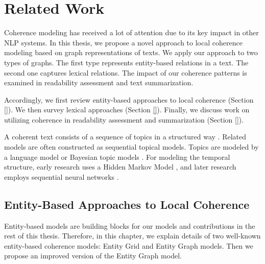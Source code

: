 
\chapter{Related Work}
\label{ch:related_work}
 
Coherence modeling has received a lot of attention due to its key impact in other NLP systems. 
In this thesis, we propose a novel approach to local coherence modeling based on graph representations of texts. 
We apply our approach to two types of graphs. 
The first type represents entity-based relations in a text.
The second one captures lexical relations. 
The impact of our coherence patterns is examined in readability assessment and text summarization. 

Accordingly, we first review entity-based approaches to local coherence (Section \ref{}). 
We then survey lexical approaches (Section \ref{}). 
Finally, we discuss work on utilizing coherence in readability assessment and summarization (Section \ref{}). 

A coherent text consists of a sequence of topics in a structured way \cite{marcu97b,hearst97,gallery03}. 
Related models are often constructed as sequential topical models. 
Topics are modeled by a language model \cite{blei01} or Bayesian topic models \cite{eisenstein08}.
For modeling the temporal structure, early research uses a Hidden Markov Model \cite{barzilay04}, and  
later research employs sequential neural networks \cite{}. 

\section{Entity-Based Approaches to Local Coherence}
\label{sec:rel-entity-models}

 
Entity-based models are building blocks for our models and contributions in the rest of this thesis. 
Therefore, in this chapter, we explain details of two well-known entity-based coherence models: Entity Grid and Entity Graph models. 
Then we propose an improved version of the Entity Graph model.  


